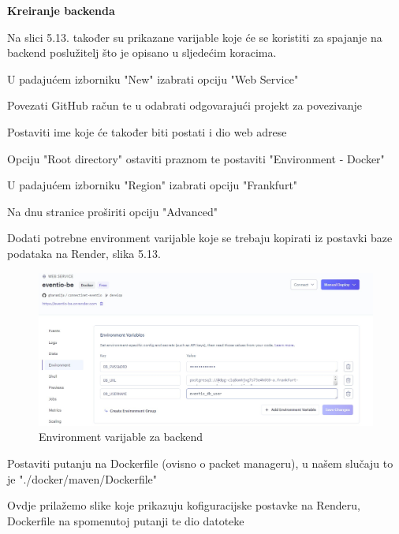			\textbf{Kreiranje backenda}
			
			Na slici 5.13. također su prikazane varijable koje će se koristiti za spajanje na backend poslužitelj što je opisano u sljedećim koracima.
			
			\begin{packed_enum}
				
				\item  U padajućem izborniku "New" izabrati opciju "Web Service"
				\item	Povezati GitHub račun te u odabrati odgovarajući projekt za povezivanje
				\item	Postaviti ime koje će također biti postati i dio web adrese
				\item	Opciju "Root directory" ostaviti praznom te postaviti "Environment - Docker"
				\item 	U padajućem izborniku "Region" izabrati opciju "Frankfurt"
				\item 	Na dnu stranice proširiti opciju "Advanced"
				\item 	Dodati potrebne environment varijable koje se trebaju kopirati iz postavki baze podataka na Render, slika 5.13.
				
				\begin{figure}[H]
					\includegraphics[scale=0.3]{deploy/backendEnv.jpeg}
					\centering
					\caption{Environment varijable za backend}
					\label{fig:promjene}
				\end{figure}
				
				\item 	Postaviti putanju na Dockerfile (ovisno o packet manageru), u našem slučaju to je "./docker/maven/Dockerfile"
				
				Ovdje prilažemo slike koje prikazuju kofiguracijske postavke na Renderu, Dockerfile na spomenutoj putanji te dio datoteke 
				

\end{packed_enum}
